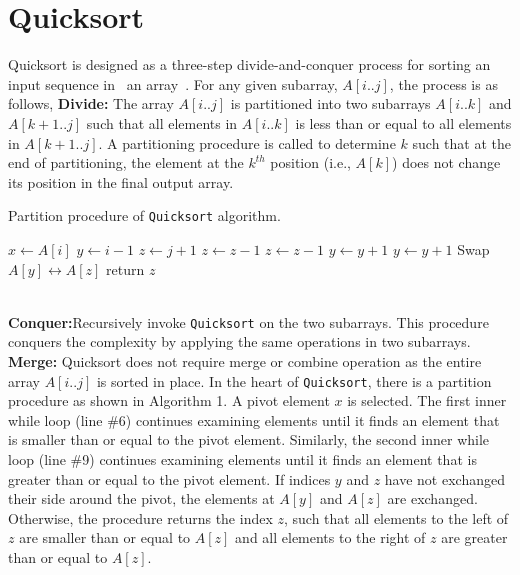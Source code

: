 \documentclass[10pt, twocolumn, a4paper]{article}
\let\bold\textbf
\let\cour\texttt
\begin{document}
\section{Quicksort}
Quicksort is designed as a three-step divide-and-conquer process for sorting an input sequence in ~an array~\cite{cormen}. For any given subarray, $A[i..j]$, the process is as follows,\newline
\bold{Divide:} The array $A[i..j]$ is partitioned into two subarrays $A[i..k]$ and $A[k+1..j]$ such that all elements in $A[i..k]$ is less than or equal to all elements in $A[k+1..j]$. A partitioning procedure is called to determine $k$ such that at the end of partitioning, the element at the $k^{th}$ position (i.e., $A[k]$) does not change its position in the final output array.
\newpage
\begin{algorithm}
  \caption{Partition procedure of \cour{Quicksort} algorithm.}
  \label{algo:partition}
  \begin{algorithmic}[1]
    \newline
    \newline
    \State $x\gets A[i]$
    \State $y\gets i-1$
    \State $z\gets j+1$
      \State $z\gets z-1$
        \State $z\gets z-1$
      \EndWhile
      \State $y\gets y+1$
        \State $y\gets y+1$
      \EndWhile
        \State Swap $A[y]\leftrightarrow A[z]$
      \Else
        \State return $z$
      \EndIf
    \EndWhile
    \EndProcedure
  \end{algorithmic}
\end{algorithm}
\noindent\\
\bold{Conquer:}Recursively invoke \cour{Quicksort} on the two subarrays. This procedure conquers the complexity by applying the same operations in two subarrays\medskip.\newline
\bold{Merge:} Quicksort does not require merge or combine operation as the entire array $A[i..j]$ is sorted in place.\newline
\indent In the heart of \cour{Quicksort}, there is a partition procedure as shown in Algorithm 1. A pivot element $x$ is selected. The first inner while loop (line \#6) continues examining elements until it finds an element that is smaller than or equal to the pivot element. Similarly, the second inner while loop (line \#9) continues examining elements until it finds an element that is greater than or equal to the pivot element. If indices $y$ and $z$ have not exchanged their side around the pivot, the elements at $A[y]$ and $A[z]$ are exchanged. Otherwise, the procedure returns the index $z$, such that all elements to the left of $z$ are smaller than or equal to $A[z]$ and all elements to the right of $z$ are greater than or equal to $A[z]$.\newline
\end{document}
